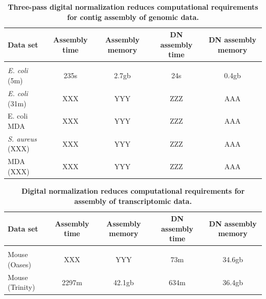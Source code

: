 \documentclass[10pt]{article}
\begin{document}
\begin{table}[!ht]
\caption{
\bf{Three-pass digital normalization reduces computational requirements for contig assembly of genomic data.}}
\begin{tabular}{|l|c|c|c|c|}

Data set & Assembly time & Assembly memory & DN assembly time & DN assembly memory \\
\hline \\
{\em E. coli} (5m) & 235s & 2.7gb & 24s & 0.4gb \\
{\em E. coli} (31m) & XXX & YYY & ZZZ & AAA \\
E. coli MDA & XXX & YYY & ZZZ & AAA \\
{\em S. aureus} (XXX) & XXX & YYY & ZZZ & AAA \\
MDA (XXX) & XXX & YYY & ZZZ & AAA \\

\end{tabular}
\begin{flushleft}
\end{flushleft}
\label{tab:dngenome}
\end{table}


\begin{table}[!ht]
\caption{
\bf{Digital normalization reduces computational requirements for assembly of transcriptomic data.}}

\begin{tabular}{|l|c|c|c|c|}

Data set & Assembly time & Assembly memory & DN assembly time & DN assembly memory \\
\hline \\
Mouse (Oases) & XXX & YYY & 73m & 34.6gb \\
Mouse (Trinity) & 2297m & 42.1gb & 634m & 36.4gb \\

\end{tabular}

\begin{flushleft}
\end{flushleft}
\label{tab:dntrans}
\end{table}
\end{document}
